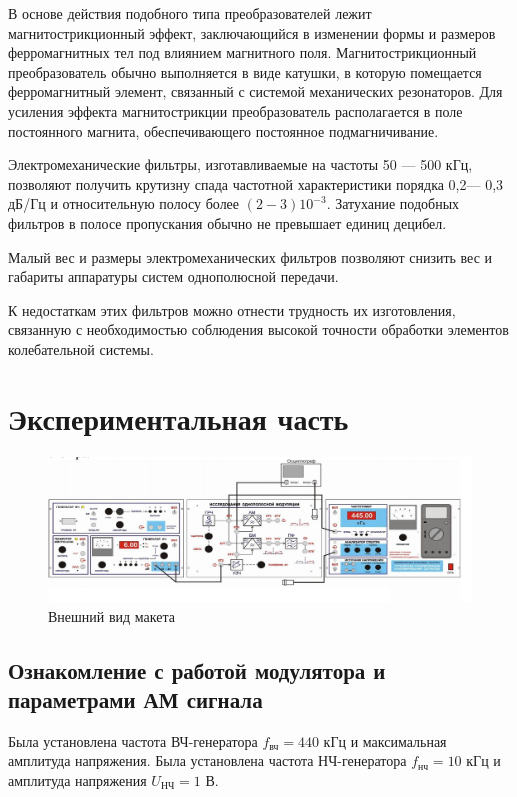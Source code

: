 В основе действия подобного типа преобразователей лежит магнитострикционный эффект, заключающийся в изменении формы и размеров ферромагнитных тел под влиянием магнитного поля. Магнитострикционный преобразователь обычно выполняется в виде катушки, в которую помещается ферромагнитный элемент, связанный с системой механических резонаторов. Для усиления эффекта магнитострикции преобразователь располагается в поле постоянного магнита, обеспечивающего постоянное подмагничивание.

Электромеханические фильтры, изготавливаемые на частоты 50 — 500 кГц, позволяют получить крутизну спада частотной характеристики порядка 0,2— 0,3 дБ/Гц и относительную полосу более $(2 - 3) 10^{-3}$. Затухание подобных
фильтров в полосе пропускания обычно не превышает единиц децибел.

Малый вес и размеры электромеханических фильтров позволяют снизить
вес и габариты аппаратуры систем однополюсной передачи. 

К недостаткам этих фильтров можно отнести трудность их изготовления, связанную с необходимостью соблюдения высокой точности обработки элементов колебательной системы.
\section{Экспериментальная часть}

\begin{figure}[H]
	\centering
	\includegraphics[width=\linewidth]{img/img00}
	\caption{Внешний вид макета}
\end{figure}


\subsection{Ознакомление с работой модулятора и параметрами АМ сигнала}

Была установлена частота ВЧ-генератора $f_{\text{вч}}=440$ кГц и максимальная амплитуда напряжения.
Была установлена частота НЧ-генератора $f_{\text{нч}}=10$ кГц и  амплитуда напряжения 
$U_{\text{НЧ}} = 1 $ В.



